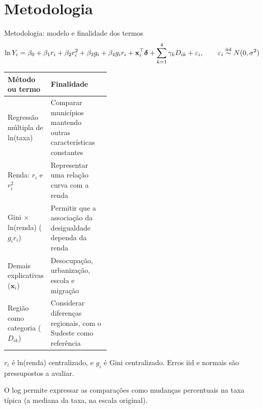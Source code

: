 \documentclass[aspectratio=169,11pt,xcolor=table]{beamer}
\begin{document}
\section{Metodologia}
\begin{frame}{Metodologia: modelo e finalidade dos termos}
\vspace{-0.4em}
{\small
\[
\ln Y_i = \beta_0 + \beta_1 r_i + \beta_2 r_i^2 + \beta_3 g_i + \beta_4 g_i r_i + \mathbf{x}_i^{\top}\bm{\delta} + \sum_{k=1}^{4} \gamma_k D_{ik} + \varepsilon_i,
\qquad \varepsilon_i \overset{\text{iid}}{\sim} N(0, \sigma^2)
\]}
\vspace{-0.2em}
{\small
\noindent\begin{tabularx}{0.99\linewidth}{@{}>{\raggedright\arraybackslash}p{0.40\linewidth}X@{}}
\toprule
\textbf{Método ou termo} & \textbf{Finalidade}\\
\midrule
Regressão múltipla de ln(taxa) & Comparar municípios mantendo outras características constantes\\[0.3em]
Renda: $r_i$ e $r_i^2$ & Representar uma relação curva com a renda\\[0.3em]
Gini $\times$ ln(renda) ($g_i r_i$) & Permitir que a associação da desigualdade dependa da renda\\[0.3em]
Demais explicativas ($\mathbf{x}_i$) & Desocupação, urbanização, escola e migração\\[0.3em]
Região como categoria ($D_{ik}$) & Considerar diferenças regionais, com o Sudeste como referência\\
\bottomrule
\end{tabularx}\par}
\vspace{0.5em}
{\footnotesize $r_i$ é ln(renda) centralizado, e $g_i$ é Gini centralizado. Erros iid e normais são pressupostos a avaliar.\par O log permite expressar as comparações como mudanças percentuais na taxa típica (a mediana da taxa, na escala original).}
\end{frame}
\end{document}
